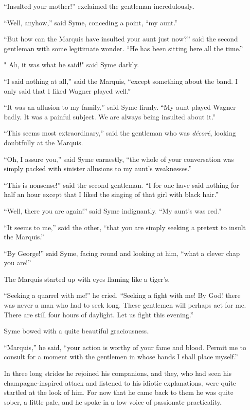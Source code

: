 \documentclass{book}
\begin{document}
“Insulted your mother!” exclaimed the gentleman incredulously.

“Well, anyhow,” said Syme, conceding a point, “my aunt.”

“But how can the Marquis have insulted your aunt just now?” said the second gentleman with some legitimate wonder. “He has been sitting here all the time.”

" Ah, it was what he said!" said Syme darkly.

“I said nothing at all,” said the Marquis, “except something about the band. I only said that I liked Wagner played well.”

“It was an allusion to my family,” said Syme firmly. “My aunt played Wagner badly. It was a painful subject. We are always being insulted about it.”

“This seems most extraordinary,” said the gentleman who was \emph{décoré}, looking doubtfully at the Marquis.

“Oh, I assure you,” said Syme earnestly, “the whole of your conversation was simply packed with sinister allusions to my aunt’s weaknesses.”

“This is nonsense!” said the second gentleman. “I for one have said nothing for half an hour except that I liked the singing of that girl with black hair.”

“Well, there you are again!” said Syme indignantly. “My aunt’s was red.”

“It seems to me,” said the other, “that you are simply seeking a pretext to insult the Marquis.”

“By George!” said Syme, facing round and looking at him, “what a clever chap you are!”

The Marquis started up with eyes flaming like a tiger’s.

“Seeking a quarrel with me!” he cried. “Seeking a fight with me! By God! there was never a man who had to seek long. These gentlemen will perhaps act for me. There are still four hours of daylight. Let us fight this evening.”

Syme bowed with a quite beautiful graciousness.

“Marquis,” he said, “your action is worthy of your fame and blood. Permit me to consult for a moment with the gentlemen in whose hands I shall place myself.”

In three long strides he rejoined his companions, and they, who had seen his champagne-inspired attack and listened to his idiotic explanations, were quite startled at the look of him. For now that he came back to them he was quite sober, a little pale, and he spoke in a low voice of passionate practicality.
\end{document}
